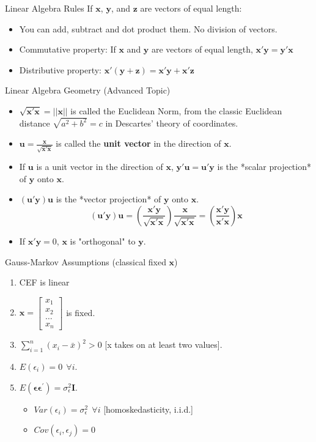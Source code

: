 \documentclass[aspectratio=169, handout]{beamer}
\numberwithin{equation}{section}
\begin{document}
\begin{frame}{Linear Algebra Rules}
If $\bm{x}$, $\bm{y}$, and $\bm{z}$ are vectors of equal length: 
\begin{itemize}
\item You can add, subtract and dot product them.  No division of vectors. 
\item Commutative property: If $\bm{x}$ and $\bm{y}$ are vectors of equal length, $\bm{x'y}=\bm{y'x}$
\item Distributive property: $\bm{x'(y+z)}=\bm{x'y}+\bm{x'z}$
\end{itemize}
\end{frame}

\begin{frame}{Linear Algebra Geometry (Advanced Topic)}
\begin{itemize}
\item $\sqrt{\bm{x}'\bm{x}}=||\bm{x}||$ is called the Euclidean Norm, from the classic Euclidean distance $\sqrt{a^2+b^2}=c$ in Descartes' theory of coordinates.
\item $\bm{u}=\frac{\bm{x}}{\sqrt{\bm{x}'\bm{x}}}$ is called the \textbf{unit vector} in the direction of $\bm{x}$.
\item If $\bm{u}$ is a unit vector in the direction of $\bm{x}$, $\bm{y'u}=\bm{u'y}$ is the *scalar projection* of $\bm{y}$ onto $\bm{x}$.
\item $\bm{(u'y) u}$ is the *vector projection* of $\bm{y}$ onto $\bm{x}$. 
$$\bm{(u'y) u}=\left(\frac{\bm{x'}\bm{y}}{\sqrt{\bm{x}'\bm{x}}}\right) \frac{\bm{x}}{\sqrt{\bm{x}'\bm{x}}}=\left(\frac{\bm{x'}\bm{y}}{\bm{x}'\bm{x}}\right) \bm{x}$$
\item If $\bm{x'y}=0$, $\bm{x}$ is "orthogonal" to $\bm{y}$.
\end{itemize}
\end{frame}


\begin{frame}{Gauss-Markov Assumptions (classical fixed $\bm{x}$)}
\begin{enumerate}
\item CEF is linear\pause
\item $\bm{x}=\begin{bmatrix} x_1\\ x_2\\ \ldots\\ x_n\end{bmatrix}$ is fixed.\pause
\item $\sum_{i=1}^n (x_i - \bar{x})^2>0$ [x takes on at least two values]. \pause
\item $E(\epsilon_i)=0\ \ \forall i$.\pause
\item $E(\bm{\epsilon}\bm{\epsilon}^{'})=\sigma_\epsilon^2\bm{I}$.\pause
\begin{itemize}
\item $Var(\epsilon_i)=\sigma_\epsilon^2\ \ \forall i$ [homoskedasticity, i.i.d.]\pause
\item $Cov(\epsilon_i,\epsilon_j)=0$
\end{itemize}
\end{enumerate}
\end{frame}
\end{document}
